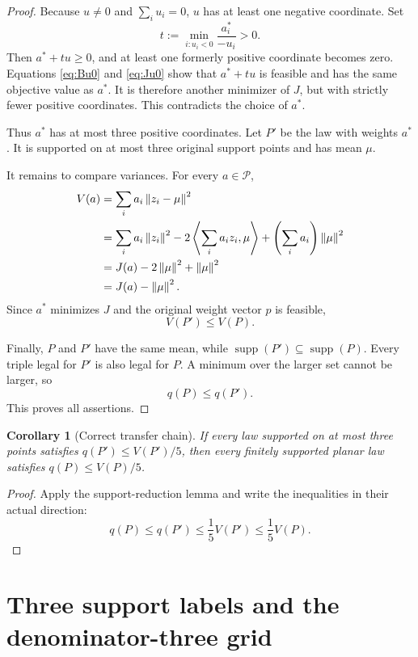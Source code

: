 \documentclass[11pt]{article}
\newtheorem{corollary}[theorem]{Corollary}
\theoremstyle{definition}
\theoremstyle{remark}
\newcommand{\supp}{\operatorname{supp}}
\newcommand{\ip}[2]{\left\langle #1,#2\right\rangle}
\newcommand{\norm}[1]{\left\lVert #1\right\rVert}
\begin{document}
\begin{proof}
Because $u\ne0$ and $\sum_i u_i=0$, $u$ has at least one negative coordinate.  Set
\begin{equation}
t:=\min_{i:u_i<0}\frac{a_i^*}{-u_i}>0.
\label{eq:push-time}
\end{equation}
Then $a^*+tu\ge0$, and at least one formerly positive coordinate becomes zero.  Equations \eqref{eq:Bu0} and \eqref{eq:Ju0} show that $a^*+tu$ is feasible and has the same objective value as $a^*$.  It is therefore another minimizer of $J$, but with strictly fewer positive coordinates.  This contradicts the choice of $a^*$.

Thus $a^*$ has at most three positive coordinates.  Let $P'$ be the law with weights $a^*$.  It is supported on at most three original support points and has mean $\mu$.

It remains to compare variances.  For every $a\in\mathcal P$,
\begin{align}
V(a)
&=\sum_i a_i\norm{z_i-\mu}^2 \notag\\
&=\sum_i a_i\norm{z_i}^2
 -2\ip{\sum_i a_i z_i}{\mu}
 +\left(\sum_i a_i\right)\norm{\mu}^2 \notag\\
&=J(a)-2\norm{\mu}^2+\norm{\mu}^2 \notag\\
&=J(a)-\norm{\mu}^2.
\label{eq:variance-J}
\end{align}
Since $a^*$ minimizes $J$ and the original weight vector $p$ is feasible,
\[
V(P')\le V(P).
\]

Finally, $P$ and $P'$ have the same mean, while $\supp(P')\subseteq\supp(P)$.  Every triple legal for $P'$ is also legal for $P$.  A minimum over the larger set cannot be larger, so
\[
q(P)\le q(P').
\]
This proves all assertions.
\end{proof}

\begin{corollary}[Correct transfer chain]
If every law supported on at most three points satisfies $q(P')\le V(P')/5$, then every finitely supported planar law satisfies $q(P)\le V(P)/5$.
\end{corollary}

\begin{proof}
Apply the support-reduction lemma and write the inequalities in their actual direction:
\begin{equation}
q(P)\le q(P')\le\frac15V(P')\le\frac15V(P).
\label{eq:transfer-chain}
\end{equation}
\end{proof}

\section{Three support labels and the denominator-three grid}
\end{document}
